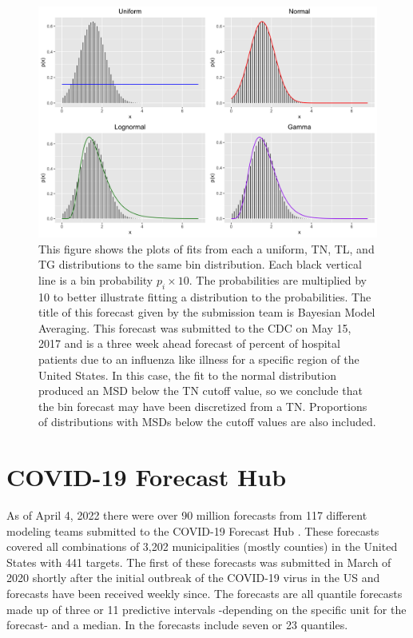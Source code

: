 \documentclass[11pt,notitlepage]{isuthesis}
\begin{document}
\begin{figure}[htbp]
\centerline{\includegraphics[scale=.15]{Images/flu_fit_17_10_3.png}}
\begin{center}
\begin{minipage}{10cm}
\captionsetup{font=scriptsize}
\caption[Parametric distribution fits to binned distribution]{This figure shows
the plots of fits from each a uniform, TN, TL,
and TG distributions to the same bin distribution. Each black vertical line is
a bin probability $p_i \times 10$. The probabilities are multiplied by 10 to 
better illustrate fitting a distribution to the probabilities.
The title of this forecast
given by the submission team is Bayesian Model Averaging. This forecast was
submitted to the CDC on May 15, 2017 and is a three week ahead forecast of
percent of hospital patients due to an influenza like illness for a specific
region of the United States.
In this case, the fit to the normal distribution produced an MSD below the 
TN cutoff value, so we conclude that the bin forecast may have been
discretized from a TN. Proportions of distributions with MSDs 
below the cutoff values are also included.}
\label{fig:binparamfits}
\end{minipage}
\end{center}
\end{figure}



\section{COVID-19 Forecast Hub}

As of April 4, 2022 there were over 90 million forecasts  
from 117 different modeling teams submitted to the COVID-19 Forecast Hub 
\cite[]{zoltarcovid}. 
These 
forecasts covered all combinations of 3,202 municipalities (mostly counties) 
in the United States with 441 targets. The first of these forecasts was 
submitted in March of 2020 shortly after the initial outbreak of the COVID-19 
virus in 
the US and forecasts have been received weekly since. 
The forecasts are all quantile forecasts made up of three or 11 predictive 
intervals -depending on the specific unit for the forecast-
and a median. In the forecasts include seven or 23 quantiles.
\end{document}
